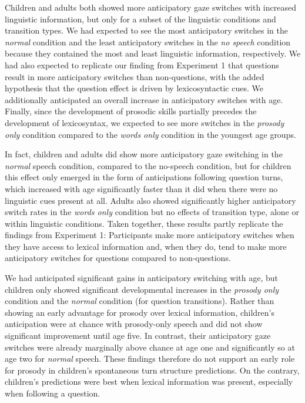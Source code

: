 \documentclass[authoryear, 12pt]{elsarticle}
\begin{document}
Children and adults both showed more anticipatory gaze switches with increased linguistic information, but only for a subset of the linguistic conditions and transition types. We had expected to see the most anticipatory switches in the \textit{normal} condition and the least anticipatory switches in the \textit{no speech} condition because they contained the most and least linguistic information, respectively. We had also expected to replicate our finding from Experiment 1 that questions result in more anticipatory switches than non-questions, with the added hypothesis that the question effect is driven by lexicosyntactic cues. We additionally anticipated an overall increase in anticipatory switches with age. Finally, since the development of prosodic skills partially precedes the development of lexicosyntax, we expected to see more switches in the \textit{prosody only} condition compared to the \textit{words only} condition in the youngest age groups.

In fact, children and adults did show more anticipatory gaze switching in the \textit{normal} speech condition, compared to the no-speech condition, but for children this effect only emerged in the form of anticipations following question turns, which increased with age significantly faster than it did when there were no linguistic cues present at all. Adults also showed significantly higher anticipatory switch rates in the \textit{words only} condition but no effects of transition type, alone or within linguistic conditions. Taken together, these results partly replicate the findings from Experiment 1: Participants make more anticipatory switches when they have access to lexical information and, when they do, tend to make more anticipatory switches for questions compared to non-questions.

We had anticipated significant gains in anticipatory switching with age, but children only showed significant developmental increases in the \textit{prosody only} condition and the \textit{normal} condition (for question transitions). Rather than showing an early advantage for prosody over lexical information, children's anticipation were at chance with prosody-only speech and did not show significant improvement until age five. In contrast, their anticipatory gaze switches were already marginally above chance at age one and significantly so at age two for \textit{normal} speech. These findings therefore do not support an early role for prosody in children's spontaneous turn structure predictions. On the contrary, children's predictions were best when lexical information was present, especially when following a question.
\end{document}
